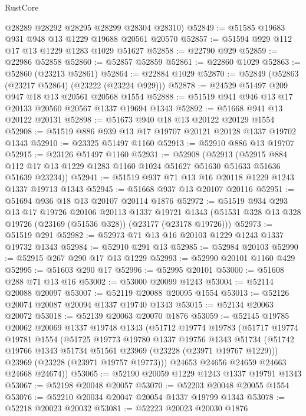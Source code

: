 \begin{lexlean}{RustCore}
\begin{coremodule}
      @28289
      @28292
      @28295
      @28299
      @28304
      @28310)
@52849 := @51585 @19683 @931 @948 @13 @1229 @19688 @20561 @20570
@52857 := @51594 @929 @112 @17 @13 @1229 @1283 @1029 @51627
@52858 := @22790 @929
@52859 := @22986 @52858
@52860 := @52857 @52859
@52861 := @22860 @1029
@52863 := @52860 (@23213 @52861)
@52864 := @22884 @1029
@52870 := @52849 (@52863 (@23217 @52864) (@23222 (@23224 @929)))
@52878 := @24529 @51497 @209 @947 @18 @13 @20561 @20568 @1554
@52888 := @51519 @941 @946 @13 @17 @20133 @20560 @20567 @1337 @19694 @1343
@52892 := @51668 @941 @13 @20122 @20131
@52898 := @51673 @940 @18 @13 @20122 @20129 @1554
@52908 := @51519 @886 @939 @13 @17 @19707 @20121 @20128 @1337 @19702 @1343
@52910 := @23325 @51497 @1160
@52913 := @52910 @886 @13 @19707
@52915 := @23126 @51497 @1160
@52931 := @52908
    (@52913
      (@52915 @884 @112 @17 @13 @1229 @1283 @1160 @1024 @51627 @51630 @51633 @51636 @51639 @23234))
@52941 := @51519 @937 @71 @13 @16 @20118 @1229 @1243 @1337 @19713 @1343
@52945 := @51668 @937 @13 @20107 @20116
@52951 := @51694 @936 @18 @13 @20107 @20114 @1876
@52972 := @51519
    @934
    @293
    @13
    @17
    @19726
    @20106
    @20113
    @1337
    @19721
    @1343
    (@51531 @328 @13 @328 @19726 (@23169 (@51536 @328)) (@23177 (@23178 @19726)))
@52973 := @51519 @291
@52982 := @52973 @71 @13 @16 @20103 @1229 @1243 @1337 @19732 @1343
@52984 := @52910 @291 @13
@52985 := @52984 @20103
@52990 := @52915 @267 @290 @17 @13 @1229
@52993 := @52990 @20101 @1160 @429
@52995 := @51603 @290 @17
@52996 := @52995 @20101
@53000 := @51608 @288 @71 @13 @16
@53002 := @53000 @20099 @1243
@53004 := @52114 @20088 @20097
@53007 := @52119 @20088 @20095 @1554
@53013 := @52126 @20074 @20087 @20094 @1337 @19740 @1343
@53015 := @52134 @20063 @20072
@53018 := @52139 @20063 @20070 @1876
@53059 := @52145
    @19785
    @20062
    @20069
    @1337
    @19748
    @1343
    (@51712
      @19774
      @19783
      (@51717
        @19774
        @19781
        @1554
        (@51725
          @19773
          @19780
          @1337
          @19756
          @1343
          @51734
          (@51742 @19766 @1343 @51734 @51561 @23969 (@23228 (@23971 @19767 @1229)))
          @23969
          (@23228 (@23971 @19757 @19773)))
        @24653
        @24656
        @24659
        @24663
        @24668
        @24674))
@53065 := @52190 @20059 @1229 @1243 @1337 @19791 @1343
@53067 := @52198 @20048 @20057
@53070 := @52203 @20048 @20055 @1554
@53076 := @52210 @20034 @20047 @20054 @1337 @19799 @1343
@53078 := @52218 @20023 @20032
@53081 := @52223 @20023 @20030 @1876

\end{coremodule}
\end{lexlean}

